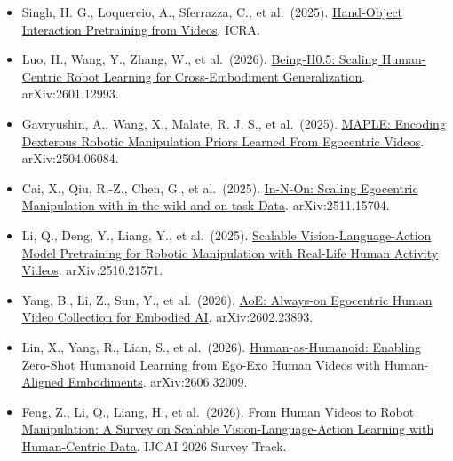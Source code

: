 \begin{itemize}
  Bahl, S., Gupta, A., \& Pathak, D. (2022). \href{https://arxiv.org/abs/2207.09450}{Human-to-Robot Imitation in the Wild}. Robotics: Science and Systems.
\item
  Singh, H. G., Loquercio, A., Sferrazza, C., et al.~(2025). \href{https://arxiv.org/abs/2409.08273}{Hand-Object Interaction Pretraining from Videos}. ICRA.
\item
  Luo, H., Wang, Y., Zhang, W., et al.~(2026). \href{https://arxiv.org/abs/2601.12993}{Being-H0.5: Scaling Human-Centric Robot Learning for Cross-Embodiment Generalization}. arXiv:2601.12993.
\item
  Gavryushin, A., Wang, X., Malate, R. J. S., et al.~(2025). \href{https://arxiv.org/abs/2504.06084}{MAPLE: Encoding Dexterous Robotic Manipulation Priors Learned From Egocentric Videos}. arXiv:2504.06084.
\item
  Cai, X., Qiu, R.-Z., Chen, G., et al.~(2025). \href{https://arxiv.org/abs/2511.15704}{In-N-On: Scaling Egocentric Manipulation with in-the-wild and on-task Data}. arXiv:2511.15704.
\item
  Li, Q., Deng, Y., Liang, Y., et al.~(2025). \href{https://arxiv.org/abs/2510.21571}{Scalable Vision-Language-Action Model Pretraining for Robotic Manipulation with Real-Life Human Activity Videos}. arXiv:2510.21571.
\item
  Yang, B., Li, Z., Sun, Y., et al.~(2026). \href{https://arxiv.org/abs/2602.23893}{AoE: Always-on Egocentric Human Video Collection for Embodied AI}. arXiv:2602.23893.
\item
  Lin, X., Yang, R., Lian, S., et al.~(2026). \href{https://arxiv.org/abs/2606.32009}{Human-as-Humanoid: Enabling Zero-Shot Humanoid Learning from Ego-Exo Human Videos with Human-Aligned Embodiments}. arXiv:2606.32009.
\item
  Feng, Z., Li, Q., Liang, H., et al.~(2026). \href{https://arxiv.org/abs/2606.00054}{From Human Videos to Robot Manipulation: A Survey on Scalable Vision-Language-Action Learning with Human-Centric Data}. IJCAI 2026 Survey Track.
\end{itemize}

\clearpage
